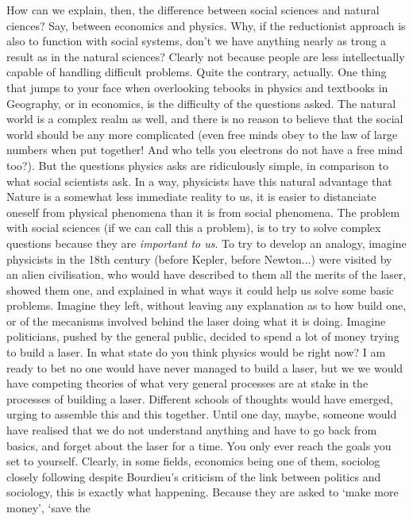 How can we explain, then, the difference between social sciences and natural
ciences? Say, between economics and physics. Why, if the reductionist approach
is also to function with social systems, don't we have anything nearly as trong
a result as in the natural sciences? Clearly not because people are less
intellectually capable of handling difficult problems. Quite the
contrary, actually. One thing that jumps to your face when overlooking tebooks
in physics and textbooks in Geography, or in economics, is the difficulty of the
questions asked. The natural world is a complex realm as well, and there is no
reason to believe that the social world should be any more complicated (even
free minds obey to the law of large numbers when put together! And who tells you
electrons do not have a free mind too?). But the questions physics asks are
ridiculously simple, in comparison to what social scientists ask. In a way,
physicists have this natural advantage that Nature is a somewhat less immediate
reality to us, it is easier to distanciate oneself from physical phenomena than
it is from social phenomena. The problem with social sciences (if we can call
this a problem), is to try to solve complex questions because they are
\emph{important to us}. To try to develop an analogy, imagine physicists in the
18th century (before Kepler, before Newton...) were visited by an alien
civilisation, who would have described to them all the merits of the laser,
showed them one, and explained in what ways it could help us solve some basic
problems. Imagine they left, without leaving any explanation as to how build
one, or of the mecanisms involved behind the laser doing what it is doing.
Imagine politicians, pushed by the general public, decided to spend a lot of
money trying to build a laser. In what state do you think physics would be right
now? I am ready to bet no one would have never managed to build a laser, but we
we would have competing theories of what very general processes are at stake in
the processes of building a laser. Different schools of thoughts would have
emerged, urging to assemble this and this together. Until one day, maybe,
someone would have realised that we do not understand anything and have to go
back from basics, and forget about the laser for a time.
You only ever reach the goals you set to yourself.
Clearly, in some fields, economics being one of them, sociolog closely following
despite Bourdieu's criticism of the link between politics and sociology, this is
exactly what happening. Because they are asked to `make more money', `save the
